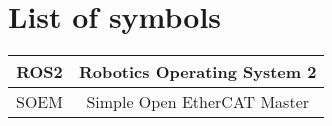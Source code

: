 \section*{List of symbols}

\begin{table}[H]
	\centering
	\begin{tabular}{|c|c|}
		\hline
		ROS2 & Robotics Operating System 2 \\
		\hline
		SOEM & Simple Open EtherCAT Master \\
		\hline
	\end{tabular}
\end{table}